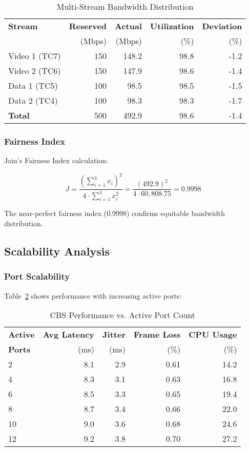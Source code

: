 \documentclass[10pt, journal, compsoc]{IEEEtran}
\begin{document}
\begin{table}[h]
\centering
\caption{Multi-Stream Bandwidth Distribution}
\label{tab:fairness}
\begin{tabular}{lrrrr}
\toprule
\textbf{Stream} & \textbf{Reserved} & \textbf{Actual} & \textbf{Utilization} & \textbf{Deviation} \\
 & (Mbps) & (Mbps) & (\%) & (\%) \\
\midrule
Video 1 (TC7) & 150 & 148.2 & 98.8 & -1.2 \\
Video 2 (TC6) & 150 & 147.9 & 98.6 & -1.4 \\
Data 1 (TC5) & 100 & 98.5 & 98.5 & -1.5 \\
Data 2 (TC4) & 100 & 98.3 & 98.3 & -1.7 \\
\midrule
\textbf{Total} & 500 & 492.9 & 98.6 & -1.4 \\
\bottomrule
\end{tabular}
\end{table}

\subsubsection{Fairness Index}

Jain's Fairness Index calculation:

\begin{equation}
J = \frac{(\sum_{i=1}^{4} x_i)^2}{4 \cdot \sum_{i=1}^{4} x_i^2} = \frac{(492.9)^2}{4 \cdot 60,808.75} = 0.9998
\end{equation}

The near-perfect fairness index (0.9998) confirms equitable bandwidth distribution.

\subsection{Scalability Analysis}

\subsubsection{Port Scalability}

Table~\ref{tab:port_scalability} shows performance with increasing active ports:

\begin{table}[h]
\centering
\caption{CBS Performance vs. Active Port Count}
\label{tab:port_scalability}
\begin{tabular}{lrrrr}
\toprule
\textbf{Active} & \textbf{Avg Latency} & \textbf{Jitter} & \textbf{Frame Loss} & \textbf{CPU Usage} \\
\textbf{Ports} & (ms) & (ms) & (\%) & (\%) \\
\midrule
2 & 8.1 & 2.9 & 0.61 & 14.2 \\
4 & 8.3 & 3.1 & 0.63 & 16.8 \\
6 & 8.5 & 3.3 & 0.65 & 19.4 \\
8 & 8.7 & 3.4 & 0.66 & 22.0 \\
10 & 9.0 & 3.6 & 0.68 & 24.6 \\
12 & 9.2 & 3.8 & 0.70 & 27.2 \\
\bottomrule
\end{tabular}
\end{table}
\end{document}
